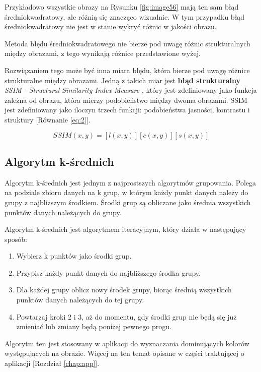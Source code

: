 Przykładowo wszystkie obrazy na Rysunku \ref{fig:image56} mają ten sam błąd średniokwadratowy, ale różnią się znacząco wizualnie. W tym przypadku błąd średniokwadratowy nie jest w stanie wykryć różnic w jakości obrazu. 

Metoda błędu średniokwadratowego nie bierze pod uwagę różnic strukturalnych między obrazami, z tego wynikają różnice przedstawione wyżej.

Rozwiązaniem tego może być inna miara błędu, która bierze pod uwagę różnice strukturalne między obrazami. Jedną z takich miar jest \textbf{błąd strukturalny} \textit{SSIM - Structural Similarity Index Measure} \cite{1284395}, który jest zdefiniowany jako funkcja zależna od obrazu, która mierzy podobieństwo między dwoma obrazami. SSIM jest zdefiniowany jako iloczyn trzech funkcji: podobieństwa jasności, kontrastu i struktury [Równanie \ref{eq:2}].

\begin{equation}
    SSIM(x,y) = [l(x,y)][c(x,y)][s(x,y)] \label{eq:2}
\end{equation}


\subsection*{Algorytm k-średnich}

Algorytm k-średnich jest jednym z najprostszych algorytmów grupowania. Polega na podziale zbioru danych na k grup, w którym każdy punkt danych należy do grupy z najbliższym środkiem. Środki grup są obliczane jako średnia wszystkich punktów danych należących do grupy.

Algorytm k-średnich jest algorytmem iteracyjnym, który działa w następujący sposób:

\begin{enumerate}
    \item Wybierz k punktów jako środki grup.
    \item Przypisz każdy punkt danych do najbliższego środka grupy.
    \item Dla każdej grupy oblicz nowy środek grupy, biorąc średnią wszystkich punktów danych należących do tej grupy.
    \item Powtarzaj kroki 2 i 3, aż do momentu, gdy środki grup nie będą się już zmieniać lub zmiany będą poniżej pewnego progu.
\end{enumerate}

Algorytm ten jest stosowany w aplikacji do wyznaczania dominujących kolorów występujących na obrazie. Więcej na ten temat opisane w części traktującej o aplikacji [Rozdział \ref{chap:app}].


